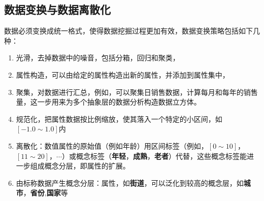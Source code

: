\subsection{数据变换与数据离散化}
\par 数据必须变换成统一格式，使得数据挖掘过程更加有效，数据变换策略包括如下几种：
\begin{enumerate}[(1)]
\item 光滑，去掉数据中的噪音，包括分箱，回归和聚类，
\item 属性构造，可以由给定的属性构造出新的属性，并添加到属性集中，
\item 聚集，对数据进行汇总，例如，可以聚集日销售数据，计算每月和每年的销售量，这一步用来为多个抽象层的数据分析构造数据立方体。
\item 规范化，把属性数据按比例缩放，使其落入一个特定的小区间，如$[-1.0 \sim 1.0]$内
\item 离散化：数值属性的原始值（例如年龄）用区间标签（例如，$[0 \sim 10]$，$[11 \sim 20]$，$\cdots$）或概念标签（\textbf{年轻}，\textbf{成熟}，\textbf{老者}）代替，这些概念标签能进一步组成概念分层，即属性的扩展。
\item 由标称数据产生概念分层：属性，如\textbf{街道}，可以泛化到较高的概念层，如\textbf{城市}，\textbf{省份},\textbf{国家}等
\end{enumerate}

